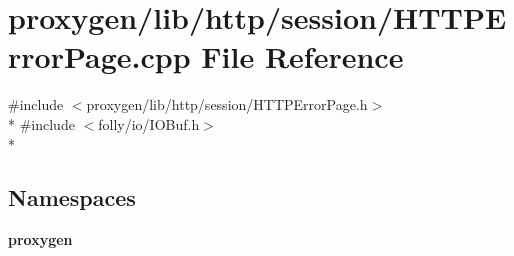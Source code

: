 \section{proxygen/lib/http/session/\+H\+T\+T\+P\+Error\+Page.cpp File Reference}
\label{HTTPErrorPage_8cpp}
{\ttfamily \#include $<$proxygen/lib/http/session/\+H\+T\+T\+P\+Error\+Page.\+h$>$}\\*
{\ttfamily \#include $<$folly/io/\+I\+O\+Buf.\+h$>$}\\*
\subsection*{Namespaces}
\begin{DoxyCompactItemize}
\item 
 {\bf proxygen}
\end{DoxyCompactItemize}
